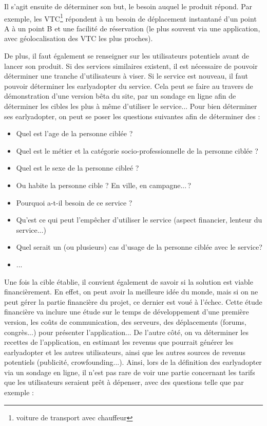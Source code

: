 Il s'agit ensuite de déterminer son but, le besoin auquel le produit répond. Par exemple, les VTC\footnote{voiture de transport avec chauffeur} répondent à un besoin de déplacement instantané d'un point A à un point B et une facilité de réservation (le plus souvent via une application, avec géolocalisation des VTC les plus proches).  

De plus, il faut également se renseigner sur les utilisateurs potentiels avant de lancer son produit. Si des services similaires existent, il est nécessaire de pouvoir déterminer une tranche d'utilisateurs à viser. Si le service est nouveau, il faut pouvoir déterminer les \gls{earlyadopter} du service. Cela peut se faire au travers de démonstration d'une version bêta du site, par un sondage en ligne afin de déterminer les cibles les plus à même d'utiliser le service... Pour bien déterminer ses \gls{earlyadopter}, on peut se poser les questions suivantes afin de déterminer des  : 

\begin{itemize}
	\item Quel est l'age de la personne ciblée ?
	\item Quel est le métier et la catégorie socio-professionnelle de la personne ciblée ?
	\item Quel est le sexe de la personne cibleé ? 
	\item Ou habite la personne cible ? En ville, en campagne... ? 
	\item Pourquoi a-t-il besoin de ce service ? 
	\item Qu'est ce qui peut l'empêcher d'utiliser le service (aspect financier, lenteur du service...) 
	\item Quel serait un (ou plusieurs) cas d'usage de la personne ciblée avec le service?
	\item ...
\end{itemize}

Une fois la cible établie, il convient également de savoir si la solution est viable financièrement. En effet, on peut avoir la meilleure idée du monde, mais si on ne peut gérer la partie financière du projet, ce dernier est voué à l'échec. Cette étude financière va inclure une étude sur le temps de développement d'une première version, les coûts de communication, des serveurs, des déplacements (forums, congrès...) pour présenter l'application... De l'autre côté, on va déterminer les recettes de l'application, en estimant les revenus que pourrait générer les \gls{earlyadopter} et les autres utilisateurs, ainsi que les autres sources de revenus potentiels (publicité, crowfounding...). Ainsi, lors de la définition des \gls{earlyadopter} via un sondage en ligne, il n'est pas rare de voir une partie concernant les tarifs que les utilisateurs seraient prêt à dépenser, avec des questions telle que par exemple : 

